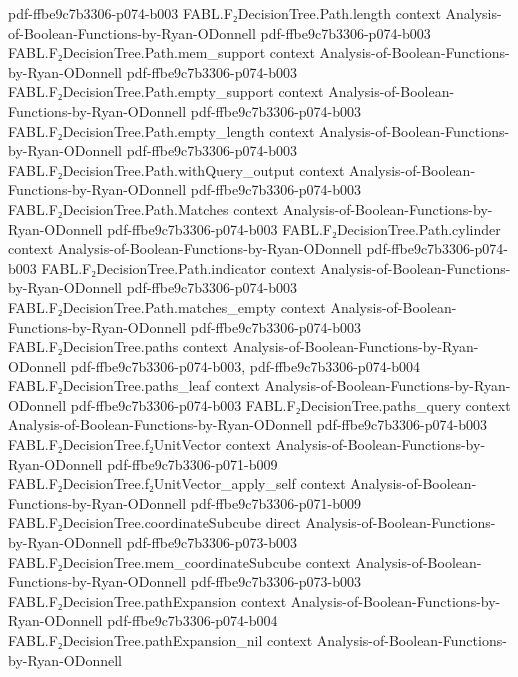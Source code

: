 \begin{theorem}
  {pdf-ffbe9c7b3306-p074-b003}
\proofstep
  {FABL.F₂DecisionTree.Path.length}
  {context}
  {Analysis-of-Boolean-Functions-by-Ryan-ODonnell}
  {pdf-ffbe9c7b3306-p074-b003}
\proofstep
  {FABL.F₂DecisionTree.Path.mem_support}
  {context}
  {Analysis-of-Boolean-Functions-by-Ryan-ODonnell}
  {pdf-ffbe9c7b3306-p074-b003}
\proofstep
  {FABL.F₂DecisionTree.Path.empty_support}
  {context}
  {Analysis-of-Boolean-Functions-by-Ryan-ODonnell}
  {pdf-ffbe9c7b3306-p074-b003}
\proofstep
  {FABL.F₂DecisionTree.Path.empty_length}
  {context}
  {Analysis-of-Boolean-Functions-by-Ryan-ODonnell}
  {pdf-ffbe9c7b3306-p074-b003}
\proofstep
  {FABL.F₂DecisionTree.Path.withQuery_output}
  {context}
  {Analysis-of-Boolean-Functions-by-Ryan-ODonnell}
  {pdf-ffbe9c7b3306-p074-b003}
\proofstep
  {FABL.F₂DecisionTree.Path.Matches}
  {context}
  {Analysis-of-Boolean-Functions-by-Ryan-ODonnell}
  {pdf-ffbe9c7b3306-p074-b003}
\proofstep
  {FABL.F₂DecisionTree.Path.cylinder}
  {context}
  {Analysis-of-Boolean-Functions-by-Ryan-ODonnell}
  {pdf-ffbe9c7b3306-p074-b003}
\proofstep
  {FABL.F₂DecisionTree.Path.indicator}
  {context}
  {Analysis-of-Boolean-Functions-by-Ryan-ODonnell}
  {pdf-ffbe9c7b3306-p074-b003}
\proofstep
  {FABL.F₂DecisionTree.Path.matches_empty}
  {context}
  {Analysis-of-Boolean-Functions-by-Ryan-ODonnell}
  {pdf-ffbe9c7b3306-p074-b003}
\proofstep
  {FABL.F₂DecisionTree.paths}
  {context}
  {Analysis-of-Boolean-Functions-by-Ryan-ODonnell}
  {pdf-ffbe9c7b3306-p074-b003,
    pdf-ffbe9c7b3306-p074-b004}
\proofstep
  {FABL.F₂DecisionTree.paths_leaf}
  {context}
  {Analysis-of-Boolean-Functions-by-Ryan-ODonnell}
  {pdf-ffbe9c7b3306-p074-b003}
\proofstep
  {FABL.F₂DecisionTree.paths_query}
  {context}
  {Analysis-of-Boolean-Functions-by-Ryan-ODonnell}
  {pdf-ffbe9c7b3306-p074-b003}
\proofstep
  {FABL.F₂DecisionTree.f₂UnitVector}
  {context}
  {Analysis-of-Boolean-Functions-by-Ryan-ODonnell}
  {pdf-ffbe9c7b3306-p071-b009}
\proofstep
  {FABL.F₂DecisionTree.f₂UnitVector_apply_self}
  {context}
  {Analysis-of-Boolean-Functions-by-Ryan-ODonnell}
  {pdf-ffbe9c7b3306-p071-b009}
\proofstep
  {FABL.F₂DecisionTree.coordinateSubcube}
  {direct}
  {Analysis-of-Boolean-Functions-by-Ryan-ODonnell}
  {pdf-ffbe9c7b3306-p073-b003}
\proofstep
  {FABL.F₂DecisionTree.mem_coordinateSubcube}
  {context}
  {Analysis-of-Boolean-Functions-by-Ryan-ODonnell}
  {pdf-ffbe9c7b3306-p073-b003}
\proofstep
  {FABL.F₂DecisionTree.pathExpansion}
  {context}
  {Analysis-of-Boolean-Functions-by-Ryan-ODonnell}
  {pdf-ffbe9c7b3306-p074-b004}
\proofstep
  {FABL.F₂DecisionTree.pathExpansion_nil}
  {context}
  {Analysis-of-Boolean-Functions-by-Ryan-ODonnell}

\end{theorem}
